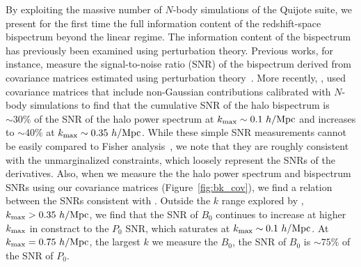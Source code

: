 By exploiting the massive number of $N$-body simulations of the Quijote 
suite, we present for the first time the full information content of the 
redshift-space bispectrum beyond the linear regime. The information content 
of the bispectrum has previously been examined using perturbation 
theory. Previous works, for instance, measure the signal-to-noise ratio (SNR) 
of the bispectrum derived from covariance matrices estimated using perturbation 
theory~\citep{sefusatti2005, chan2017}. More recently, \cite{chan2017},
used covariance matrices that include non-Gaussian contributions calibrated with 
$N$-body simulations to find that the cumulative SNR of the halo bispectrum is 
$\sim 30\%$ of the SNR of the halo power spectrum at $k_{\rm max} \sim 0.1~h/{\rm Mpc}$ 
and increases to $\sim 40\%$ at $k_{\rm max}\sim 0.35~h/{\rm Mpc}$. While these simple 
SNR measurements cannot be easily compared to Fisher analysis~\citep{repp2015, blot2016}, 
we note that they are roughly consistent with the unmarginalized constraints, 
which loosely represent the SNRs of the derivatives. 
Also, when we measure the the halo power spectrum and bispectrum SNRs using our 
covariance matrices (Figure~\ref{fig:bk_cov}), we find a relation between the 
SNRs consistent with \cite{chan2017}. Outside the $k$ range explored by \cite{chan2017},  
$k_{\rm max}>0.35~h/{\rm Mpc}$, we find that the SNR of $B_0$ continues to increase 
at higher $k_{\rm max}$ in constract to the $P_0$ SNR, which saturates at 
$k_{\rm max}\sim 0.1~h/{\rm Mpc}$. At $k_{\rm max} = 0.75~h/{\rm Mpc}$, the largest $k$ we 
measure the $B_0$, the SNR of $B_0$ is $\sim75\%$ of the SNR of $P_0$.

